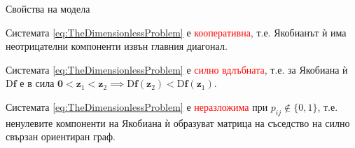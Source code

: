 \begin{frame}[t]{Свойства на модела}
  \begin{proposition}
    Системата \eqref{eq:TheDimensionlessProblem} е \textcolor{red}{кооперативна}, т.е. Якобианът ѝ има неотрицателни компоненти извън главния диагонал.
  \end{proposition}

  \begin{proposition}
    Системата \eqref{eq:TheDimensionlessProblem} е \textcolor{red}{силно вдлъбната}, т.е. за Якобиана ѝ $\mathrm{D}\boldsymbol{f}$ е в сила $\pmb{0} < \boldsymbol{z}_1 < \boldsymbol{z}_2 \implies \mathrm{D}\boldsymbol{f}(\boldsymbol{z}_2) < \mathrm{D}\boldsymbol{f}(\boldsymbol{z}_1)$.
  \end{proposition}

  \begin{proposition}
    Системата \eqref{eq:TheDimensionlessProblem} е \textcolor{red}{неразложима} при $p_{ij} \notin \{0, 1\}$, т.е. ненулевите компоненти на Якобиана ѝ образуват матрица на съседство на силно свързан ориентиран граф.
  \end{proposition}
\end{frame}


